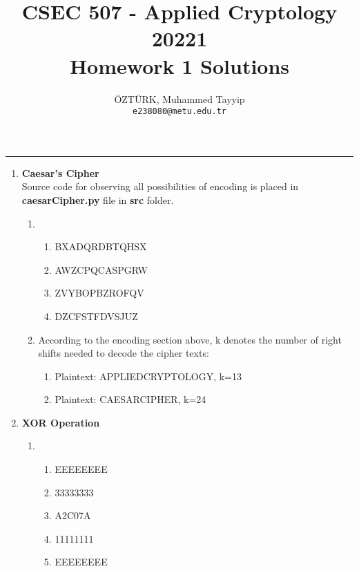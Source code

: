 \documentclass[12pt,a4paper, margin=1in]{article}
\author{
  ÖZTÜRK, Muhammed Tayyip\\
  \texttt{e238080@metu.edu.tr}
}
\title{CSEC 507 - Applied Cryptology \\
20221\\
Homework 1 Solutions}
\begin{document}
\maketitle

\noindent\rule{19cm}{1.2pt}

\begin{enumerate}

    \item 
    \textbf{Caesar's Cipher}\\
    Source code for observing all possibilities of encoding is placed in \textbf{caesarCipher.py} file in \textbf{src} folder.
        \begin{enumerate}
            \item 
            \begin{enumerate}
                \item 
                BXADQRDBTQHSX
                \item 
                AWZCPQCASPGRW
                \item 
                ZVYBOPBZROFQV
                \item 
                DZCFSTFDVSJUZ
            \end{enumerate}
            \item 
            According to the encoding section above, k denotes the number of right shifts needed to decode the cipher texts:
            \begin{enumerate}
                \item 
                Plaintext: APPLIEDCRYPTOLOGY, k=13
                \item
                Plaintext: CAESARCIPHER, k=24
            \end{enumerate}
        \end{enumerate}
        
        
    \item
    \textbf{XOR Operation}
        \begin{enumerate}
            \item 
            \begin{enumerate}
                \item 
                EEEEEEEE
                \item 
                33333333
                \item 
                A2C07A
                \item 
                11111111
                \item 
                EEEEEEEE
            \end{enumerate}
        \end{enumerate}
        

\end{enumerate}
\end{document}
